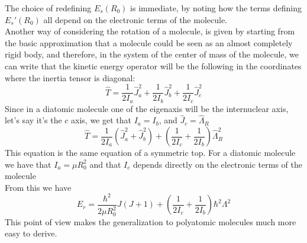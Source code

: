 \documentclass[a4paper, 11pt]{book}
\newcommand{\1}{\opr{\mathds{1}}}
\newcommand{\opr}[1]{\hat{#1}}
\theoremstyle{plain}
\begin{document}
	The choice of redefining $E_s(R_0)$ is immediate, by noting how the terms defining $E_s'(R_0)$ all depend on the electronic terms of the molecule.\\
	Another way of considering the rotation of a molecule, is given by starting from the basic approximation that a molecule could be seen as an almost completely rigid body, and therefore, in the system of the center of mass of the molecule, we can write that the kinetic energy operator will be the following in the coordinates where the inertia tensor is diagonal:
	\begin{equation}
		\opr{T}=\frac{1}{2I_a}\opr{J}_a^2+\frac{1}{2I_b}\opr{J}_b^2+\frac{1}{2I_c}\opr{J}_c^2
		\label{eq:kineticoperatorquantumtop}
	\end{equation}
	Since in a diatomic molecule one of the eigenaxis will be the internuclear axis, let's say it's the $c$ axis, we get that $I_a=I_b$, and $\opr{J}_c=\opr{\Lambda}_R$
	\begin{equation*}
		\opr{T}=\frac{1}{2I_a}(\opr{J}_a^2+\opr{J}_b^2)+\left( \frac{1}{2I_c}+\frac{1}{2I_b} \right)\opr{\Lambda}_R^2
	\end{equation*}
	This equation is the same equation of a symmetric top. For a diatomic molecule we have that $I_a=\mu R_0^2$ and that $I_c$ depends directly on the electronic terms of the molecule\\
	From this we have
	\begin{equation}
		E_{r}=\frac{\hbar^2}{2\mu R_0^2}J(J+1)+\left( \frac{1}{2I_c}+\frac{1}{2I_b} \right)\hbar^2\Lambda^2
		\label{eq:rotationalenergyII}
	\end{equation}
	This point of view makes the generalization to polyatomic molecules much more easy to derive.\\
\end{document}
